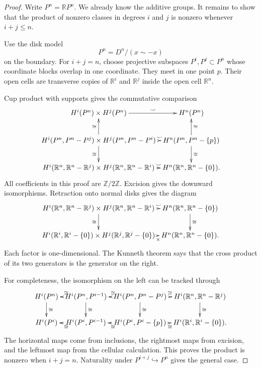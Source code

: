 \begin{proof}
Write $P^n=\mathbb{R}P^n$.  We already
know the additive groups.  It remains to
show that the product of nonzero classes in
degrees $i$ and $j$ is nonzero whenever
$i+j\leq n$.

\noindent
Use the disk model
$$
P^n=D^n/(x\sim-x)
$$
on the boundary.  For $i+j=n$, choose
projective subspaces $P^i,P^j\subset P^n$
whose coordinate blocks overlap in one
coordinate.  They meet in one point $p$.
Their open cells are transverse copies of
$\mathbb{R}^i$ and $\mathbb{R}^j$ inside
the open cell $\mathbb{R}^n$.

\noindent
Cup product with supports gives the
commutative comparison
$$
\xymatrix@C=.35em@R=2.2em{
H^i(P^n)\times H^j(P^n)
  \ar[r]^-\smile
  & H^n(P^n) \\
H^i(P^n,P^n-P^j)
  \times H^j(P^n,P^n-P^i)
  \ar[u]^\cong
  \ar[r]^-\smile
  \ar[d]_\cong
  & H^n(P^n,P^n-\{p\})
    \ar[u]_\cong
    \ar[d]^\cong \\
H^i(\mathbb{R}^n,
\mathbb{R}^n-\mathbb{R}^j)
  \times
H^j(\mathbb{R}^n,
\mathbb{R}^n-\mathbb{R}^i)
  \ar[r]^-\smile
  & H^n(\mathbb{R}^n,
    \mathbb{R}^n-\{0\}).
}
$$
All coefficients in this proof are
$\mathbb{Z}/2\mathbb{Z}$.  Excision gives
the downward isomorphisms.  Retraction onto
normal disks gives the diagram
$$
\xymatrix@C=.3em@R=2.2em{
H^i(\mathbb{R}^n,
\mathbb{R}^n-\mathbb{R}^j)
  \times
H^j(\mathbb{R}^n,
\mathbb{R}^n-\mathbb{R}^i)
  \ar[r]^-\smile
  \ar[d]_\cong
  & H^n(\mathbb{R}^n,
    \mathbb{R}^n-\{0\})
    \ar[d]^\cong \\
H^i(\mathbb{R}^i,
\mathbb{R}^i-\{0\})
  \times
H^j(\mathbb{R}^j,
\mathbb{R}^j-\{0\})
  \ar[r]_-\times
  & H^n(\mathbb{R}^n,
    \mathbb{R}^n-\{0\}).
}
$$
Each factor is one-dimensional.  The
Kunneth theorem says that the cross product
of its two generators is the generator on
the right.

\noindent
For completeness, the isomorphism on the
left can be tracked through
$$
\xymatrix@C=.35em@R=2em{
H^i(P^n)
  \ar[d]^\cong
  & H^i(P^n,P^{i-1})
    \ar[l]_\cong
    \ar[d]^\cong
  & H^i(P^n,P^n-P^j)
    \ar[l]_\cong
    \ar[r]^\cong
    \ar[d]^\cong
  & H^i(\mathbb{R}^n,
    \mathbb{R}^n-\mathbb{R}^j)
    \ar[d]^\cong \\
H^i(P^i)
  & H^i(P^i,P^{i-1})
    \ar[l]^\cong
  & H^i(P^i,P^i-\{p\})
    \ar[l]^\cong
    \ar[r]_\cong
  & H^i(\mathbb{R}^i,
    \mathbb{R}^i-\{0\}).
}
$$
The horizontal maps come from inclusions,
the rightmost maps from excision, and the
leftmost map from the cellular calculation.
This proves the product is nonzero when
$i+j=n$.  Naturality under
$P^{i+j}\hookrightarrow P^n$ gives the
general case.
\end{proof}

